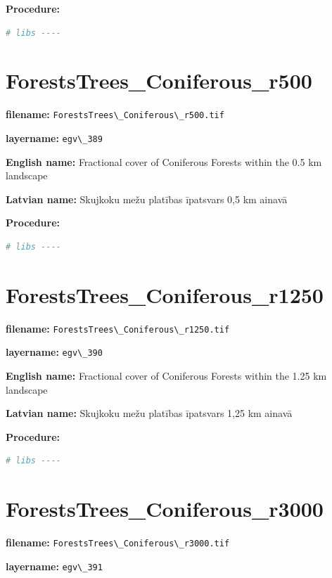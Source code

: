 \documentclass[
]{book}
\newcommand{\passthrough}[1]{#1}
\begin{document}
\textbf{Procedure:}

\begin{lstlisting}[language=R]
# libs ----
\end{lstlisting}

\section{ForestsTrees\_Coniferous\_r500}\label{ch06.389}

\textbf{filename:} \passthrough{\lstinline!ForestsTrees\_Coniferous\_r500.tif!}

\textbf{layername:} \passthrough{\lstinline!egv\_389!}

\textbf{English name:} Fractional cover of Coniferous Forests within the 0.5 km landscape

\textbf{Latvian name:} Skujkoku mežu platības īpatsvars 0,5 km ainavā

\textbf{Procedure:}

\begin{lstlisting}[language=R]
# libs ----
\end{lstlisting}

\section{ForestsTrees\_Coniferous\_r1250}\label{ch06.390}

\textbf{filename:} \passthrough{\lstinline!ForestsTrees\_Coniferous\_r1250.tif!}

\textbf{layername:} \passthrough{\lstinline!egv\_390!}

\textbf{English name:} Fractional cover of Coniferous Forests within the 1.25 km landscape

\textbf{Latvian name:} Skujkoku mežu platības īpatsvars 1,25 km ainavā

\textbf{Procedure:}

\begin{lstlisting}[language=R]
# libs ----
\end{lstlisting}

\section{ForestsTrees\_Coniferous\_r3000}\label{ch06.391}

\textbf{filename:} \passthrough{\lstinline!ForestsTrees\_Coniferous\_r3000.tif!}

\textbf{layername:} \passthrough{\lstinline!egv\_391!}
\end{document}
